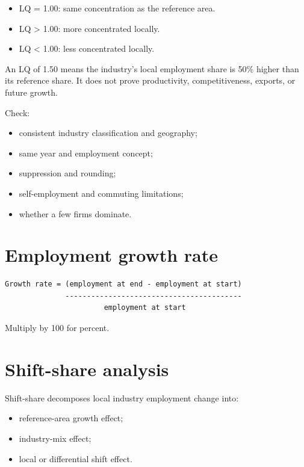 \documentclass[11pt,letterpaper,oneside,openany]{book}
\begin{document}
\begin{itemize}
\item LQ = 1.00: same concentration as the reference area.
\item LQ \textgreater{} 1.00: more concentrated locally.
\item LQ \textless{} 1.00: less concentrated locally.
\end{itemize}


An LQ of 1.50 means the industry's local employment share is 50\% higher than its reference share. It does not prove productivity, competitiveness, exports, or future growth.


Check:


\begin{itemize}
\item consistent industry classification and geography;
\item same year and employment concept;
\item suppression and rounding;
\item self-employment and commuting limitations;
\item whether a few firms dominate.
\end{itemize}


\section[Employment growth rate]{Employment growth rate}
\begin{Verbatim}[fontsize=\small,breaklines=true,breakanywhere=true,frame=single,framesep=2mm]
Growth rate = (employment at end - employment at start)
              -----------------------------------------
                       employment at start
\end{Verbatim}

Multiply by 100 for percent.


\section[Shift-share analysis]{Shift-share analysis}
Shift-share decomposes local industry employment change into:


\begin{itemize}
\item reference-area growth effect;
\item industry-mix effect;
\item local or differential shift effect.
\end{itemize}
\end{document}
